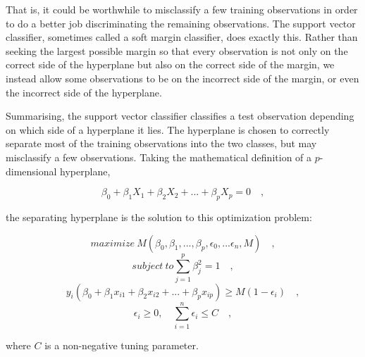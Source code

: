 \documentclass[a4paper, 12pt]{book}
\begin{document}
That is, it could be worthwhile to misclassify a few training observations
in order to do a better job discriminating the remaining observations.
The support vector classifier, sometimes called a soft margin classifier,
does exactly this. Rather than seeking the largest possible margin so that
every observation is not only on the correct side of the hyperplane but
also on the correct side of the margin, we instead allow some observations
to be on the incorrect side of the margin, or even the incorrect side of
the hyperplane.

Summarising, the support vector classifier classifies a test observation depending on
which side of a hyperplane it lies. The hyperplane is chosen to correctly
separate most of the training observations into the two classes, but may
misclassify a few observations. Taking the mathematical definition of a $p$-dimensional hyperplane, 
\begin{center}
\begin{equation}
\beta_{0} + \beta_{1}X_{1} + \beta_{2}X_{2} + ... + \beta_{p}X_{p} = 0 \quad,
\end{equation}
\end{center}
the separating hyperplane is the solution to this optimization problem:
\begin{center}
\begin{equation}
maximize\ M (\beta_{0}, \beta_{1},...,\beta_{p}, \epsilon_{0}
,...\epsilon_{n}, M)\quad,
\end{equation}
\begin{equation}
subject\ to \sum_{j=1}^{p} \beta_{j}^2 = 1 \quad,
\end{equation}
\begin{equation}
y_{i}(\beta_{0} + \beta_{1}x_{i1} + \beta_{2}x_{i2} +...+ \beta_{p}x_{ip}) \geq M(1-\epsilon_{i}) \quad, 
\end{equation}
\begin{equation}
\epsilon_{i} \geq 0, \quad \sum_{i=1}^{n}\epsilon_{i} \leq C \quad, 
\end{equation}
\end{center}

where $C$ is a non-negative tuning parameter.


\end{document}
